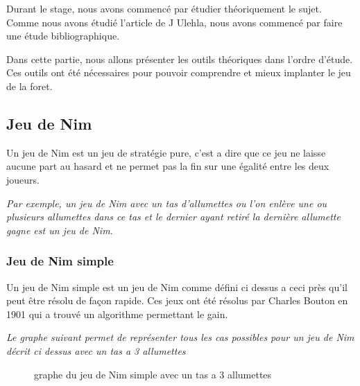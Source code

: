 Durant le stage, nous avons commencé par étudier théoriquement le sujet. Comme nous avons étudié l'article de J Ulehla, nous avons commencé par faire une étude bibliographique.

Dans cette partie, nous allons présenter les outils théoriques dans l'ordre d’étude. Ces outils ont été nécessaires pour pouvoir comprendre et mieux implanter le jeu de la foret.

\subsection{Jeu de Nim}
\label{sub:Jeu de Nim}
  Un jeu de  Nim est un jeu de stratégie pure, c'est a dire que ce jeu ne laisse aucune part au hasard et ne permet pas la fin sur une égalité entre les deux joueurs.

  \textit{
    Par exemple, un jeu de Nim avec un tas d'allumettes ou l'on enlève une ou plusieurs allumettes dans ce tas et le dernier ayant retiré la dernière allumette gagne est un jeu de Nim.
  }
  \subsubsection{Jeu de Nim simple}
  \label{subsub: Jeu de Nim simple}
    Un jeu de Nim simple est un jeu de Nim comme défini ci dessus a ceci près qu'il peut être résolu de façon rapide. Ces jeux ont été résolus par Charles Bouton en 1901 qui a trouvé un algorithme permettant le gain.

    \textit{
      Le graphe suivant permet de représenter tous les cas possibles pour un jeu de Nim décrit ci dessus avec un tas a 3 allumettes
    }
    \begin{figure}[h]
      \centering
      \caption{graphe du jeu de Nim simple avec un tas a 3 allumettes}
    \end{figure}

